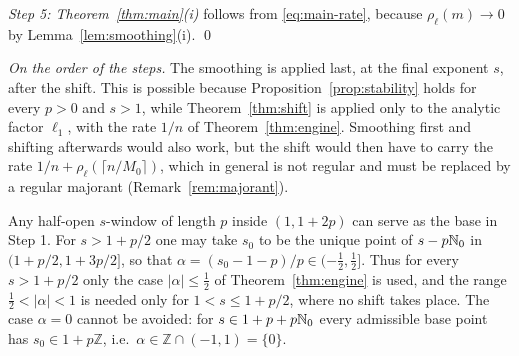 \emph{Step 5: Theorem~\ref{thm:main}(i)} follows from \eqref{eq:main-rate}, because $\rho_\ell(m)\to0$ by Lemma~\ref{lem:smoothing}(i).
\qed

\medskip
\emph{On the order of the steps.} The smoothing is applied last, at the final exponent $s$, after the shift. This is
possible because Proposition~\ref{prop:stability} holds for every $p>0$ and $s>1$, while Theorem~\ref{thm:shift} is
applied only to the analytic factor $\ell_1$, with the rate $1/n$ of Theorem~\ref{thm:engine}. Smoothing first and
shifting afterwards would also work, but the shift would then have to carry the rate $1/n+\rho_\ell(\lceil n/M_0\rceil)$,
which in general is not regular and must be replaced by a regular majorant (Remark~\ref{rem:majorant}).

\begin{remark}\label{rem:base-window}
Any half-open $s$-window of length $p$ inside $(1,1+2p)$ can serve as the base in Step 1. For $s>1+p/2$ one may take
$s_0$ to be the unique point of $s-p\mathbb{N}_0$ in $(1+p/2,1+3p/2]$, so that $\alpha=(s_0-1-p)/p\in(-\frac12,\frac12]$. Thus for
every $s>1+p/2$ only the case $|\alpha|\le\frac12$ of Theorem~\ref{thm:engine} is used, and the range $\frac12<|\alpha|<1$
is needed only for $1<s\le1+p/2$, where no shift takes place. The case $\alpha=0$ cannot be avoided: for
$s\in1+p+p\mathbb{N}_0$ every admissible base point has $s_0\in1+p\mathbb Z$, i.e.\ $\alpha\in\mathbb Z\cap(-1,1)=\{0\}$.
\end{remark}
